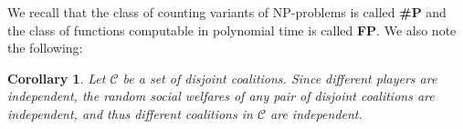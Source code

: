 \documentclass[letterpaper]{article} %
\newtheorem{problem}{Problem}
\newtheorem{remark}{Remark}
\newtheorem{corollary}{Corollary}
\begin{document}
We recall that the class of counting variants of NP-problems is called {\normalfont \textbf{\#P}} and the class of functions computable in polynomial time is called {\normalfont \textbf{FP}}. %
We also note the following:
\begin{corollary}
\label{corollary:independent}
Let $\mathcal{C}$ be a set of {\normalfont disjoint} coalitions. Since different players are independent, the random social welfares of any pair of \textit{disjoint} coalitions are independent, and thus different coalitions in $\mathcal{C}$ are independent.
\end{corollary}
\end{document}
